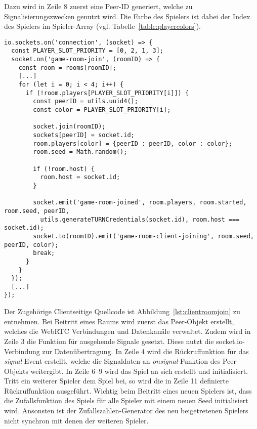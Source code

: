 Dazu wird in Zeile 8 zuerst eine Peer-ID generiert, welche zu Signalisierungszwecken genutzt wird. Die \glqq{}Farbe\grqq{} des Spielers ist dabei der Index des Spielers im Spieler-Array (vgl. Tabelle~\ref{table:playercolors}).\par

\vspace{11pt}
\lstset{language=js, style=STYLE_CODE_JS}
\begin{minipage}{\textwidth}
\begin{singlespace}
\begin{lstlisting}[caption={Event zum Betreten eines Raums -- Server.js}, captionpos=b, label={lst:join}]
io.sockets.on('connection', (socket) => {
  const PLAYER_SLOT_PRIORITY = [0, 2, 1, 3];
  socket.on('game-room-join', (roomID) => {
    const room = rooms[roomID];
    [...]
    for (let i = 0; i < 4; i++) {
      if (!room.players[PLAYER_SLOT_PRIORITY[i]]) {
        const peerID = utils.uuid4();
        const color = PLAYER_SLOT_PRIORITY[i];

        socket.join(roomID);
        sockets[peerID] = socket.id;
        room.players[color] = {peerID : peerID, color : color};
        room.seed = Math.random();

        if (!room.host) {
          room.host = socket.id;
        }

        socket.emit('game-room-joined', room.players, room.started, room.seed, peerID, 
          utils.generateTURNCredentials(socket.id), room.host === socket.id);
        socket.to(roomID).emit('game-room-client-joining', room.seed, peerID, color);
        break;
      }
    }
  });
  [...]
});
\end{lstlisting}
\end{singlespace}
\end{minipage}

Der Zugehörige Clientseitige Quellcode ist Abbildung~\ref{lst:clientroomjoin} zu entnehmen. Bei Beitritt eines Raums wird zuerst das Peer-Objekt erstellt, welches die \acs{WebRTC} Verbindungen und Datenkanäle verwaltet. Zudem wird in Zeile 3 die Funktion für ausgehende Signale gesetzt. Diese nutzt die socket.io-Verbindung zur Datenübertragung. In Zeile 4 wird die Rückruffunktion für das \textit{signal}-Event erstellt, welche die Signaldaten an \textit{onsignal}-Funktion des Peer-Objekts weitergibt. In Zeile 6--9 wird das Spiel an sich erstellt und initialisiert. Tritt ein weiterer Spieler dem Spiel bei, so wird die in Zeile 11 definierte Rückruffunktion ausgeführt. Wichtig beim Beitritt eines neuen Spielers ist, dass die Zufallsfunktion des Spiels für alle Spieler mit einem neuen Seed initialisiert wird. Ansonsten ist der Zufallszahlen-Generator des neu beigetretenen Spielers nicht synchron mit denen der weiteren Spieler.

